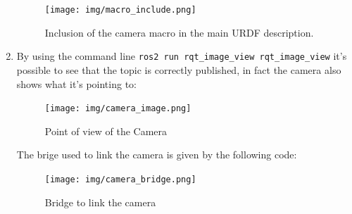 \documentclass{article}
\begin{document}
\begin{enumerate}
\begin{figure}[H]
    \centering
    \texttt{[image: img/macro\_include.png]}
    \caption{Inclusion of the camera macro in the main URDF description.}
    \label{fig:macro_include}
\end{figure}

\item By using the command line \lstinline{ros2 run rqt_image_view rqt_image_view} it's possible to see that the topic is correctly published, in fact the camera also shows what it's pointing to:
    \begin{figure}[htpb]
        \centering
        \texttt{[image: img/camera\_image.png]}
        \label{fig:camera_image}
        \caption{Point of view of the Camera}
    \end{figure}

\noindent The brige used to link the camera is given by the following code: 
    \begin{figure}[htpb]
        \centering
        \texttt{[image: img/camera\_bridge.png]}
        \label{fig:camera_bridge}
        \caption{Bridge to link the camera}
\end{figure}
\end{enumerate}
\pagebreak
\end{document}
